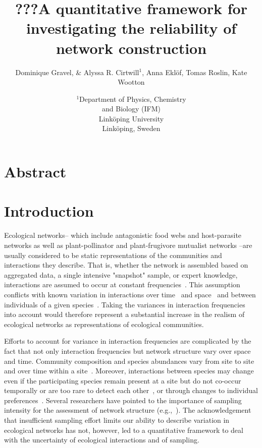 \documentclass[12pt]{article}
\title{???A quantitative framework for investigating the reliability of network construction}
\author{Dominique Gravel, \& Alyssa R. Cirtwill$^{1}$, Anna Ekl\"{o}f, Tomas Roslin, Kate Wootton}
\date{\small$^1$Department of Physics, Chemistry\\ 
and Biology (IFM)\\ 
Link\"{o}ping University\\
Link\"{o}ping, Sweden\\
 }
\begin{document}
 
\maketitle 
\raggedright
\setlength{\parindent}{15pt} 


\section*{Abstract}


\section*{Introduction}



    Ecological networks-- which include antagonistic food webs and host-parasite networks as well as plant-pollinator and plant-frugivore mutualist networks --are usually considered to be static representations of the communities and interactions they describe. That is, whether the network is assembled based on aggregated data, a single intensive "snapshot" sample, or expert knowledge, interactions are assumed to occur at constant frequencies~\citep{Olesen2011a}. This assumption conflicts with known variation in interactions over time~\citep{Kitching1987,Olesen2011a} and space~\citep{Kitching1987,Baiser2012} and between individuals of a given species~\citep{Pires2011a,Fodrie2015,Novak2015}. Taking the variances in interaction frequencies into account would therefore represent a substantial increase in the realism of ecological networks as representations of ecological communities.


    Efforts to account for variance in interaction frequencies are complicated by the fact that not only interaction frequencies but network structure vary over space and time. Community composition and species abundances vary from site to site~\citep{Baiser2012} and over time within a site~\citep{Olesen2011a}. Moreover, interactions between species may change even if the participating species remain present at a site but do not co-occur temporally or are too rare to detect each other~\citep{Tylianakis2010}, or through changes to individual preferences~\citep{Fodrie2015}. Several researchers have pointed to the importance of sampling intensity for the assessment of network structure (e.g.,~\citealp{}). The acknowledgement that insufficient sampling effort limits our ability to describe variation in ecological networks has not, however, led to a quantitative framework to deal with the uncertainty of ecological interactions and of sampling.
\end{document}
